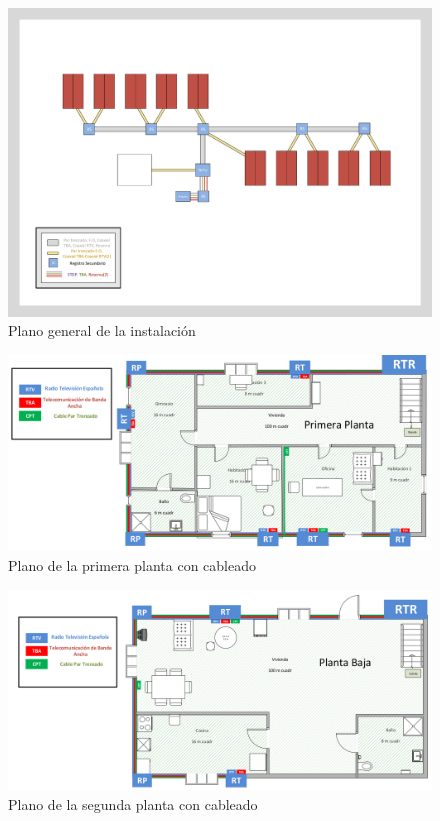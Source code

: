 \begin{landscape}
	\begin{figure}[H]
		\centering
		\includegraphics[scale=0.50]{../img/PLANOFINAL.pdf}
		\caption{Plano general de la instalación}
	\end{figure}
\end{landscape}

\begin{landscape}
	\begin{figure}[H]
		\centering
		\includegraphics[scale=0.68]{../img/PlanoCableadoVivienda1.png}
		\caption{Plano de la primera planta con cableado}
	\end{figure}
\end{landscape}

\begin{landscape}
	\begin{figure}[H]
		\centering
		\includegraphics[scale=0.68]{../img/PlanoCableadoVivienda2.png}
		\caption{Plano de la segunda planta con cableado}
	\end{figure}
\end{landscape}

